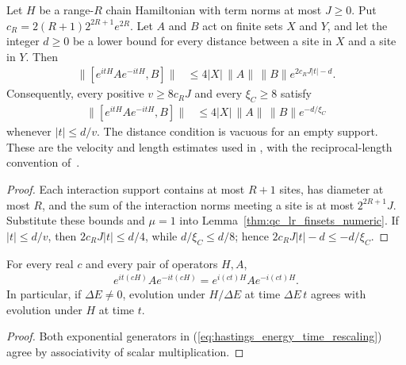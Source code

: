 \begin{lemma}
    \label{thm:hastings_chain_lieb_robinson}
    \leanok
    Let $H$ be a range-$R$ chain Hamiltonian with term norms at most $J\ge0$.
    Put $c_R=2(R+1)2^{2R+1}e^{2R}$. Let $A$ and $B$ act on finite sets
    $X$ and $Y$, and let the integer $d\ge0$ be a lower bound for every
    distance between a site in $X$ and a site in $Y$. Then
    \begin{align}
        \|[e^{itH}Ae^{-itH},B]\|
         & \le4|X|\,\|A\|\,\|B\|e^{2c_RJ|t|-d}.
        \label{eq:hastings_numeric_chain_bound}
    \end{align}
    Consequently, every positive $v\ge8c_RJ$ and every $\xi_C\ge8$ satisfy
    \begin{align}
        \|[e^{itH}Ae^{-itH},B]\|
         & \le4|X|\,\|A\|\,\|B\|e^{-d/\xi_C}
        \label{eq:hastings_chain_time_cone}
    \end{align}
    whenever $|t|\le d/v$. The distance condition is vacuous for an empty
    support. These are the velocity and length estimates used in
    \cite[lines 96--112]{Hastings2007AreaLaw}, with the reciprocal-length
    convention of~\cite{gap:hastings07_lemma1_decay_length}.
\end{lemma}
\begin{proof}\leanok
    Each interaction support contains at most $R+1$ sites, has diameter at
    most $R$, and the sum of the interaction norms meeting a site is at most
    $2^{2R+1}J$. Substitute these bounds and $\mu=1$ into
    Lemma~\ref{thm:qc_lr_finsets_numeric}. If $|t|\le d/v$, then
    $2c_RJ|t|\le d/4$, while $d/\xi_C\le d/8$; hence
    $2c_RJ|t|-d\le-d/\xi_C$.
\end{proof}

\begin{lemma}
    \label{thm:hastings_energy_time_rescaling}
    \leanok
    For every real $c$ and every pair of operators $H,A$,
    \begin{align}
        e^{it(cH)}Ae^{-it(cH)}=e^{i(ct)H}Ae^{-i(ct)H}.
        \label{eq:hastings_energy_time_rescaling}
    \end{align}
    In particular, if $\Delta E\ne0$, evolution under $H/\Delta E$ at time
    $\Delta E\,t$ agrees with evolution under $H$ at time $t$.
\end{lemma}
\begin{proof}\leanok
    Both exponential generators in
    (\ref{eq:hastings_energy_time_rescaling}) agree by associativity of
    scalar multiplication.
\end{proof}

